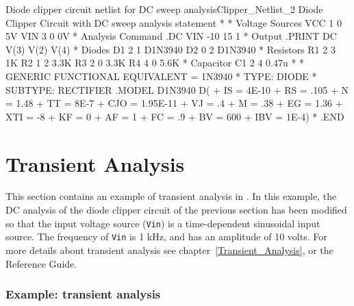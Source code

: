 \begin{NetlistFigure}{Diode clipper circuit netlist for DC sweep analysis}{Clipper_Netlist_2}
Diode Clipper Circuit with DC sweep analysis statement
*
* Voltage Sources
VCC 1 0 5V
VIN 3 0 0V
* Analysis Command
\color{XyceRed}.DC VIN -10 15 1\color{black}
* Output
\color{XyceRed}.PRINT DC V(3) V(2) V(4)\color{black}
* Diodes
D1 2 1 D1N3940
D2 0 2 D1N3940
* Resistors
R1 2 3 1K
R2 1 2 3.3K
R3 2 0 3.3K
R4 4 0 5.6K
* Capacitor
C1 2 4 0.47u
*
* GENERIC FUNCTIONAL EQUIVALENT = 1N3940
* TYPE:  DIODE
* SUBTYPE:  RECTIFIER
.MODEL D1N3940 D(
+         IS = 4E-10
+         RS = .105
+          N = 1.48
+         TT = 8E-7
+        CJO = 1.95E-11
+         VJ = .4
+          M = .38
+         EG = 1.36
+        XTI = -8
+         KF = 0
+         AF = 1
+         FC = .9
+         BV = 600
+        IBV = 1E-4)
*
.END
\end{NetlistFigure}

\section{Transient Analysis}
\label{Transient_Analysis_Sec}

This section contains an example of transient analysis
 in \Xyce{}.  In this example, the
DC analysis of the diode clipper circuit of the previous section has
been modified so that the input voltage source (\texttt{Vin}) is a
time-dependent sinusoidal input source.  The frequency of \texttt{Vin} is
1 kHz, and has an amplitude of 10 volts.  For more details about transient
analysis see chapter~\ref{Transient_Analysis}, or the \Xyce{} Reference 
Guide\ReferenceGuide{}.

\subsubsection{Example: transient analysis}

